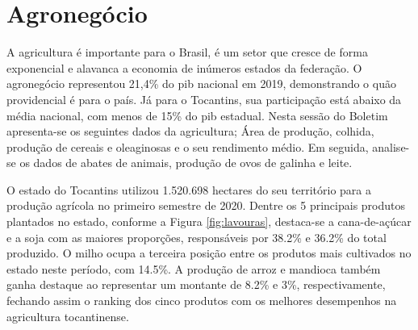 \chapter{Agronegócio}
\par A agricultura é importante para o Brasil, é um setor que cresce de forma exponencial e alavanca a economia de inúmeros estados da federação. O agronegócio representou 21,4\% do \acrshort{pib} nacional em 2019, demonstrando o quão providencial é para o país. Já para o Tocantins, sua participação está abaixo da média nacional, com menos de 15\% do \acrshort{pib} estadual. Nesta sessão do Boletim apresenta-se os seguintes dados da agricultura; Área de produção, colhida, produção de cereais e oleaginosas e o seu rendimento médio. Em seguida, analise-se os dados de abates de animais, produção de ovos de galinha e leite.

\par O estado do Tocantins utilizou 1.520.698 hectares do seu território para a produção agrícola no primeiro semestre de 2020. Dentre os 5 principais produtos plantados no estado, conforme a Figura \ref{fig:lavouras}, destaca-se a cana-de-açúcar e a soja com as maiores proporções, responsáveis por 38.2\% e 36.2\% do total produzido. O milho ocupa a terceira posição entre os produtos mais cultivados no estado neste período, com 14.5\%. A produção de arroz e mandioca também ganha destaque ao representar um montante de 8.2\% e 3\%, respectivamente, fechando assim o ranking dos cinco produtos com os melhores desempenhos na agricultura tocantinense.

